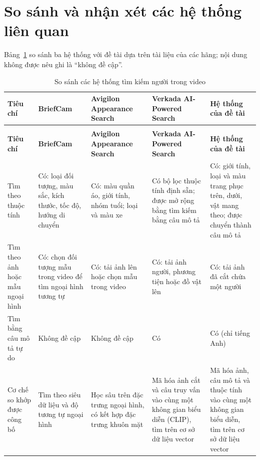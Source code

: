\section{So sánh và nhận xét các hệ thống liên quan}
\label{sec:2.2}

Bảng~\ref{tab:related-comparison} so sánh ba hệ thống với đề tài dựa trên tài liệu của các hãng; nội dung không được nêu ghi là ``không đề cập''.

\begin{longtable}{|>{\raggedright\arraybackslash}p{2.2cm}|>{\raggedright\arraybackslash}p{2.85cm}|>{\raggedright\arraybackslash}p{2.85cm}|>{\raggedright\arraybackslash}p{2.85cm}|>{\raggedright\arraybackslash}p{2.85cm}|}
\caption{So sánh các hệ thống tìm kiếm người trong video}\label{tab:related-comparison}\\
\hline
\textbf{Tiêu chí} & \textbf{BriefCam} & \textbf{Avigilon Appearance Search} & \textbf{Verkada AI-Powered Search} & \textbf{Hệ thống của đề tài} \\
\hline
\endfirsthead
\multicolumn{5}{l}{\textit{(tiếp theo Bảng~\ref{tab:related-comparison})}}\\
\hline
\textbf{Tiêu chí} & \textbf{BriefCam} & \textbf{Avigilon Appearance Search} & \textbf{Verkada AI-Powered Search} & \textbf{Hệ thống của đề tài} \\
\hline
\endhead
Tìm theo thuộc tính & Có: loại đối tượng, màu sắc, kích thước, tốc độ, hướng di chuyển & Có: màu quần áo, giới tính, nhóm tuổi; loại và màu xe & Có bộ lọc thuộc tính định sẵn; được mở rộng bằng tìm kiếm bằng câu mô tả & Có: giới tính, loại và màu trang phục trên, dưới, vật mang theo; được chuyển thành câu mô tả \\
\hline
Tìm theo ảnh hoặc mẫu ngoại hình & Có: chọn đối tượng mẫu trong video để tìm ngoại hình tương tự & Có: tải ảnh lên hoặc chọn mẫu trong video & Có: tải ảnh người, phương tiện hoặc đồ vật lên & Có: tải ảnh đã cắt chứa một người \\
\hline
Tìm bằng câu mô tả tự do & Không đề cập & Không đề cập & Có & Có (chỉ tiếng Anh) \\
\hline
Cơ chế so khớp được công bố & Tìm theo siêu dữ liệu và độ tương tự ngoại hình & Học sâu trên đặc trưng ngoại hình, có kết hợp đặc trưng khuôn mặt & Mã hóa ảnh cắt và câu truy vấn vào cùng một không gian biểu diễn (CLIP), tìm trên cơ sở dữ liệu vector & Mã hóa ảnh, câu mô tả và thuộc tính vào cùng một không gian biểu diễn, tìm trên cơ sở dữ liệu vector \\

\end{longtable}
